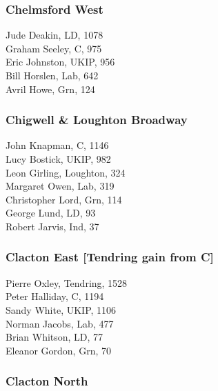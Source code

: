 \documentclass[a4paper,openany,10pt]{book}
\begin{document}
\subsubsection*{Chelmsford West}



Jude Deakin, LD, 1078\\
Graham Seeley, C, 975\\
Eric Johnston, UKIP, 956\\
Bill Horslen, Lab, 642\\
Avril Howe, Grn, 124\\


\subsubsection*{Chigwell \& Loughton Broadway}



John Knapman, C, 1146\\
Lucy Bostick, UKIP, 982\\
Leon Girling, Loughton, 324\\
Margaret Owen, Lab, 319\\
Christopher Lord, Grn, 114\\
George Lund, LD, 93\\
Robert Jarvis, Ind, 37\\


\subsubsection*{Clacton East \hspace*{\fill}\nolinebreak[1]%
\enspace\hspace*{\fill}
[Tendring gain from C]}



Pierre Oxley, Tendring, 1528\\
Peter Halliday, C, 1194\\
Sandy White, UKIP, 1106\\
Norman Jacobs, Lab, 477\\
Brian Whitson, LD, 77\\
Eleanor Gordon, Grn, 70\\


\subsubsection*{Clacton North}
\end{document}
